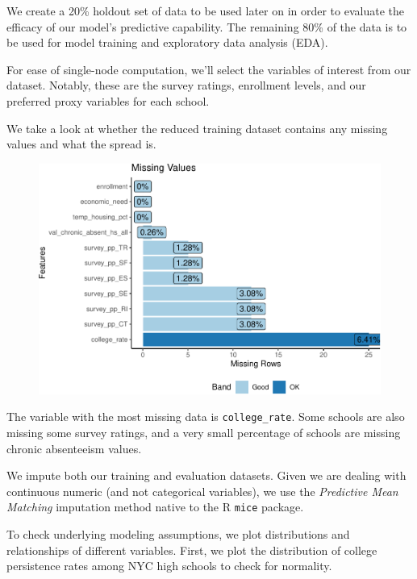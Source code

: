 \documentclass[
  man,floatsintext]{apa6}
\begin{document}
We create a 20\% holdout set of data to be used later on in order to evaluate the efficacy of our model's predictive capability. The remaining 80\% of the data is to be used for model training and exploratory data analysis (EDA).

For ease of single-node computation, we'll select the variables of interest from our dataset. Notably, these are the survey ratings, enrollment levels, and our preferred proxy variables for each school.

We take a look at whether the reduced training dataset contains any missing values and what the spread is.

\begin{figure}[H]
\includegraphics[width=\textwidth]{final-project_files/figure-latex/data4-1} \caption{ }\label{fig:data4}
\end{figure}

The variable with the most missing data is \texttt{college\_rate}. Some schools are also missing some survey ratings, and a very small percentage of schools are missing chronic absenteeism values.

We impute both our training and evaluation datasets. Given we are dealing with continuous numeric (and not categorical variables), we use the \emph{Predictive Mean Matching} imputation method native to the R \texttt{mice} package.

To check underlying modeling assumptions, we plot distributions and relationships of different variables. First, we plot the distribution of college persistence rates among NYC high schools to check for normality.
\end{document}
